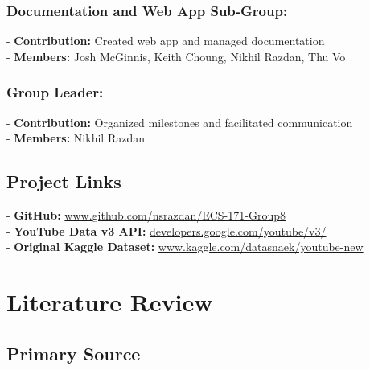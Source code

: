 \documentclass{article}
\begin{document}
\subsubsection*{Documentation and Web App Sub-Group:}
- \textbf{Contribution:} Created web app and managed documentation \\
- \textbf{Members:} Josh McGinnis, Keith Choung, Nikhil Razdan, Thu Vo
\subsubsection*{Group Leader:}
- \textbf{Contribution:} Organized milestones and facilitated communication \\
- \textbf{Members:} Nikhil Razdan

\subsection*{Project Links}
- \textbf{GitHub:} \url{www.github.com/nsrazdan/ECS-171-Group8} \\
- \textbf{YouTube Data v3 API:} \url{developers.google.com/youtube/v3/} \\
- \textbf{Original Kaggle Dataset:} \url{www.kaggle.com/datasnaek/youtube-new} \\

\section*{Literature Review}
\subsection*{Primary Source}
\end{document}
